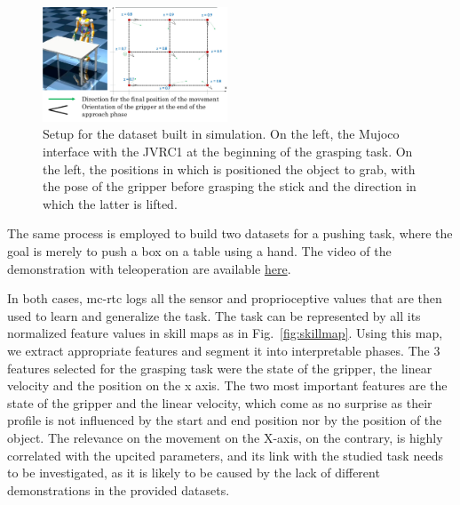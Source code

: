 \documentclass[a4paper, 10pt, conference]{ieeeconf}
\begin{document}
\begin{figure}[t]
  \centering
  \includegraphics[width=0.49\textwidth]{img/simSetup6.pdf}
  \caption{Setup for the dataset built in simulation. On the left, the Mujoco interface with the JVRC1 \cite{jvrc} at the beginning of the grasping task. On the left, the positions in which is positioned the object to grab, with the pose of the gripper before grasping the stick and the direction in which the latter is lifted.}
  \label{fig:simSetup}
\end{figure}

 The same process is employed to build two datasets for a pushing task, where the goal is merely to push a box on a table using a hand. The video of the demonstration with teleoperation are available \href{https://github.com/VictorBbt/Article_TaskGeneralization}{here}.

 In both cases, mc-rtc logs all the sensor and proprioceptive values that are then used to learn and generalize the task. The task can be represented by all its normalized feature values in skill maps as in Fig.~\ref{fig:skillmap}. Using this map, we extract appropriate features and segment it into interpretable phases. The 3 features selected for the grasping task were the state of the gripper, the linear velocity and the position on the x axis. The two most important features are the state of the gripper and the linear velocity, which come as no surprise as their profile is not influenced by the start and end position nor by the position of the object. The relevance on the movement on the X-axis, on the contrary, is highly correlated with the upcited parameters, and its link with the studied task needs to be investigated, as it is likely to be caused by the lack of different demonstrations in the provided datasets. 
\end{document}
